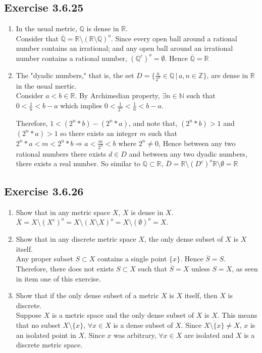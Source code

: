 \documentclass{tufte-book}
\theoremstyle{mytheoremstyle}
\theoremstyle{mylemstyle}
\theoremstyle{mydefstyle}
\begin{document}
\subsection{Exercise 3.6.25}
\begin{enumerate}
\item In the usual metric, $\mathbb{Q}$ is dense in $\mathbb{R}$.\\
Consider that $\overline{\mathbb{Q}} = \mathbb{R} \setminus (\mathbb{R}\setminus \mathbb{Q})^o$.  Since every open ball around a rational number contains an irrational; and any open ball around an irrational number contains a rational number, $(\mathbb{Q}^c)^o = \emptyset$.  Hence $\overline{\mathbb{Q}} = \mathbb{R}$

\item The "dyadic numbers," that is, the set $D = \{ \frac{a}{2^n} \in \mathbb{Q} \,|\, a,n \in \mathbb{Z}\}$, are dense in $\mathbb{R}$ in the usual mertic.\\
Consider $a < b \in \mathbb{R}$.  By Archimedian property, $\exists n \in \mathbb{N}$ such that $0 < \frac{1}{n} < b-a$ which implies $0 < \frac{1}{2^n} < \frac{1}{n} < b-a$.

Therefore, $1<(2^n *b)-(2^n*a)$, and note that, $(2^n *b) >1$ and $(2^n *a)>1$ so there exists an integer $m$ such that $2^n *a<m<2^n*b \Rightarrow a< \frac{m}{2^n} < b$ where $2^n \neq 0$,  Hence between any two rational numbers there exists $d \in D$ and between any two dyadic numbers, there exists a real number.  So similar to $\mathbb{Q} \subset \mathbb{R}$, $\overline{D} = \mathbb{R}\setminus(D^c)^o\mathbb{R} \setminus \emptyset = \mathbb{R}$

\end{enumerate}
\subsection{Exercise 3.6.26}
\begin{enumerate}

\item Show that in any metric space $X$, $X$ is dense in $X$.\\
$\overline{X} = X \setminus (X^c)^o = X\setminus(X \setminus X)^o = X\setminus (\emptyset)^o = X$.

\item Show that in any discrete metric space $X$, the only dense subset of $X$ is $X$ itself.\\
Any proper subset $S \subset X$ contains a single point $\{x\}$.  Hence $\overline{S} = S$.  Therefore, there does not exists $S \subset X$ such that $\overline{S} = X$ unless $S = X$, as seen in item one of this exercise.

\item Show that if the only dense subset of a metric $X$ is $X$ itself, then $X$ is discrete.\\
Suppose $X$ is a metric space and the only dense subset of $X$ is $X$.  This means that no subset $X\setminus\{x\}$, $\forall x \in X$ is a dense subset of $X$.  Since $\overline{X\setminus\{x\}} \neq X$, $x$ is an isolated point in $X$.  Since $x$ was arbitrary, $\forall x \in X$ are isolated and $X$ is a discrete metric space.
\end{enumerate}
\end{document}
